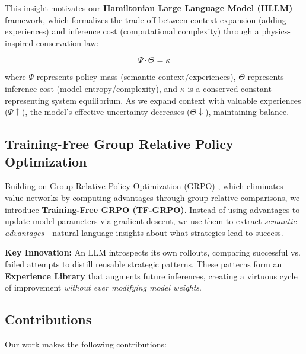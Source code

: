 This insight motivates our \textbf{Hamiltonian Large Language Model (HLLM)} framework, which formalizes the trade-off between context expansion (adding experiences) and inference cost (computational complexity) through a physics-inspired conservation law:

\begin{equation}
\Psi \cdot \Theta = \kappa
\label{eq:hamiltonian}
\end{equation}

where $\Psi$ represents policy mass (semantic context/experiences), $\Theta$ represents inference cost (model entropy/complexity), and $\kappa$ is a conserved constant representing system equilibrium. As we expand context with valuable experiences ($\Psi \uparrow$), the model's effective uncertainty decreases ($\Theta \downarrow$), maintaining balance.

\subsection{Training-Free Group Relative Policy Optimization}

Building on Group Relative Policy Optimization (GRPO) \cite{shao2024deepseekmath}, which eliminates value networks by computing advantages through group-relative comparisons, we introduce \textbf{Training-Free GRPO (TF-GRPO)}. Instead of using advantages to update model parameters via gradient descent, we use them to extract \textit{semantic advantages}—natural language insights about what strategies lead to success.

\textbf{Key Innovation:} An LLM introspects its own rollouts, comparing successful vs. failed attempts to distill reusable strategic patterns. These patterns form an \textbf{Experience Library} that augments future inferences, creating a virtuous cycle of improvement \textit{without ever modifying model weights}.

\subsection{Contributions}

Our work makes the following contributions:

